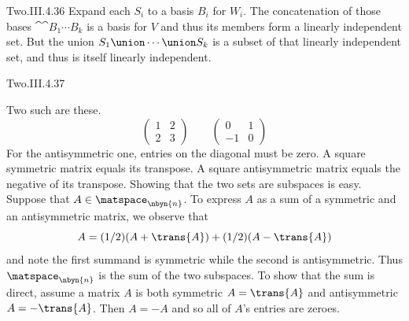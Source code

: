 \begin{ans}{Two.III.4.36}
      Expand each \( S_i \) to a basis $B_i$ for \( W_i \).
      The concatenation of those bases $\cat{\cat{B_1}{\cdots}}{B_k}$
      is a basis for \( V \) and thus its members form a linearly independent
      set.
      But the union $S_1\union\cdots\union S_k$ is a subset
      of that linearly independent set, and thus is
      itself linearly independent.
     
\end{ans}
\begin{ans}{Two.III.4.37}
      \begin{exparts}
        \partsitem Two such are these.
          \begin{equation*}
            \begin{pmatrix}
              1  &2  \\
              2  &3
            \end{pmatrix}
            \qquad
            \begin{pmatrix}
              0  &1  \\
              -1 &0
            \end{pmatrix}
          \end{equation*}
          For the antisymmetric one, entries on the diagonal must be zero.
        \partsitem A square symmetric matrix equals its transpose.
          A square antisymmetric matrix equals the negative of its transpose.
        \partsitem Showing that the two sets are subspaces is easy.
         Suppose that \( A\in\matspace_{\nbyn{n}} \).
         To express $A$ as a sum of a symmetric and an antisymmetric matrix,
         we observe that
         \begin{equation*}
            A=(1/2)(A+\trans{A}) + (1/2)(A-\trans{A})
         \end{equation*}
         and note the first summand is symmetric while the second is
         antisymmetric.
         Thus \( \matspace_{\nbyn{n}} \) is the sum of the two subspaces.
         To show that the sum is direct,
         assume a matrix \( A \) is both symmetric
         \( A=\trans{A} \) and antisymmetric \( A=-\trans{A} \).
         Then \( A=-A \) and so all of \( A \)'s entries are zeroes.
      \end{exparts}
     
\end{ans}
